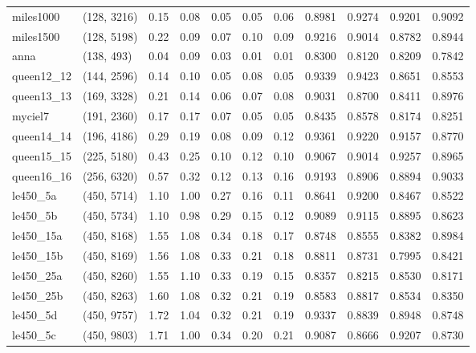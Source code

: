 \begin{tabular}{llrrrrrrrrr}
 miles1000 &  (128, 3216) &  0.15 & 0.08 & 0.05 &  0.05 &   0.06 &   0.8981 &   0.9274 &     0.9201 &      0.9092 \\
 miles1500 &  (128, 5198) &  0.22 & 0.09 & 0.07 &  0.10 &   0.09 &   0.9216 &   0.9014 &     0.8782 &      0.8944 \\
      anna &   (138, 493) &  0.04 & 0.09 & 0.03 &  0.01 &   0.01 &   0.8300 &   0.8120 &     0.8209 &      0.7842 \\
queen12\_12 &  (144, 2596) &  0.14 & 0.10 & 0.05 &  0.08 &   0.05 &   0.9339 &   0.9423 &     0.8651 &      0.8553 \\
queen13\_13 &  (169, 3328) &  0.21 & 0.14 & 0.06 &  0.07 &   0.08 &   0.9031 &   0.8700 &     0.8411 &      0.8976 \\
   myciel7 &  (191, 2360) &  0.17 & 0.17 & 0.07 &  0.05 &   0.05 &   0.8435 &   0.8578 &     0.8174 &      0.8251 \\
queen14\_14 &  (196, 4186) &  0.29 & 0.19 & 0.08 &  0.09 &   0.12 &   0.9361 &   0.9220 &     0.9157 &      0.8770 \\
queen15\_15 &  (225, 5180) &  0.43 & 0.25 & 0.10 &  0.12 &   0.10 &   0.9067 &   0.9014 &     0.9257 &      0.8965 \\
queen16\_16 &  (256, 6320) &  0.57 & 0.32 & 0.12 &  0.13 &   0.16 &   0.9193 &   0.8906 &     0.8894 &      0.9033 \\
  le450\_5a &  (450, 5714) &  1.10 & 1.00 & 0.27 &  0.16 &   0.11 &   0.8641 &   0.9200 &     0.8467 &      0.8522 \\
  le450\_5b &  (450, 5734) &  1.10 & 0.98 & 0.29 &  0.15 &   0.12 &   0.9089 &   0.9115 &     0.8895 &      0.8623 \\
 le450\_15a &  (450, 8168) &  1.55 & 1.08 & 0.34 &  0.18 &   0.17 &   0.8748 &   0.8555 &     0.8382 &      0.8984 \\
 le450\_15b &  (450, 8169) &  1.56 & 1.08 & 0.33 &  0.21 &   0.18 &   0.8811 &   0.8731 &     0.7995 &      0.8421 \\
 le450\_25a &  (450, 8260) &  1.55 & 1.10 & 0.33 &  0.19 &   0.15 &   0.8357 &   0.8215 &     0.8530 &      0.8171 \\
 le450\_25b &  (450, 8263) &  1.60 & 1.08 & 0.32 &  0.21 &   0.19 &   0.8583 &   0.8817 &     0.8534 &      0.8350 \\
  le450\_5d &  (450, 9757) &  1.72 & 1.04 & 0.32 &  0.21 &   0.19 &   0.9337 &   0.8839 &     0.8948 &      0.8748 \\
  le450\_5c &  (450, 9803) &  1.71 & 1.00 & 0.34 &  0.20 &   0.21 &   0.9087 &   0.8666 &     0.9207 &      0.8730 \\

\end{tabular}

